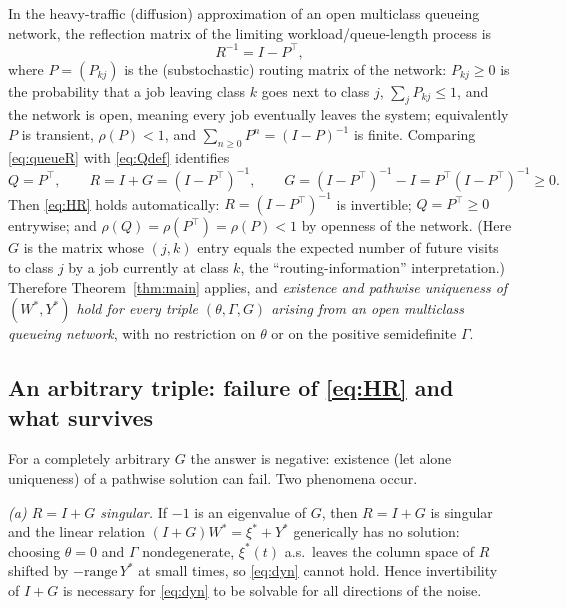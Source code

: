 \documentclass{amsart}
\theoremstyle{definition}
\theoremstyle{remark}
\begin{document}
In the heavy-traffic (diffusion) approximation of an open multiclass queueing
network, the reflection matrix of the limiting workload/queue-length process is
\begin{equation}\label{eq:queueR}
  R^{-1}=I-P^\top,
\end{equation}
where $P=(P_{kj})$ is the (substochastic) routing matrix of the network:
$P_{kj}\ge0$ is the probability that a job leaving class $k$ goes next to class
$j$, $\sum_j P_{kj}\le1$, and the network is open, meaning every job eventually
leaves the system; equivalently $P$ is transient, $\rho(P)<1$, and
$\sum_{n\ge0}P^n=(I-P)^{-1}$ is finite. Comparing \eqref{eq:queueR} with
\eqref{eq:Qdef} identifies
\[
  Q=P^\top, \qquad R=I+G=(I-P^\top)^{-1},\qquad
  G=(I-P^\top)^{-1}-I=P^\top(I-P^\top)^{-1}\ge0 .
\]
Then \eqref{eq:HR} holds automatically: $R=(I-P^\top)^{-1}$ is invertible;
$Q=P^\top\ge0$ entrywise; and $\rho(Q)=\rho(P^\top)=\rho(P)<1$ by openness of
the network. (Here $G$ is the matrix whose $(j,k)$ entry equals the expected
number of future visits to class $j$ by a job currently at class $k$, the
``routing-information'' interpretation.) Therefore
Theorem~\ref{thm:main} applies, and \emph{existence and pathwise uniqueness of
$(W^\ast,Y^\ast)$ hold for every triple $(\theta,\Gamma,G)$ arising from an open
multiclass queueing network}, with no restriction on $\theta$ or on the
positive semidefinite $\Gamma$.

\subsection{An arbitrary triple: failure of \eqref{eq:HR} and what survives}

For a completely arbitrary $G$ the answer is negative: existence (let alone
uniqueness) of a pathwise solution can fail. Two phenomena occur.

\emph{(a) $R=I+G$ singular.} If $-1$ is an eigenvalue of $G$, then $R=I+G$ is
singular and the linear relation $(I+G)W^\ast=\xi^\ast+Y^\ast$ generically has
no solution: choosing $\theta=0$ and $\Gamma$ nondegenerate, $\xi^\ast(t)$ a.s.\
leaves the column space of $R$ shifted by $-\mathrm{range}\,Y^\ast$ at small
times, so \eqref{eq:dyn} cannot hold. Hence invertibility of $I+G$ is necessary
for \eqref{eq:dyn} to be solvable for all directions of the noise.
\end{document}
